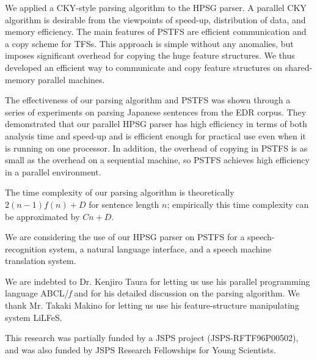   We applied a CKY-style parsing algorithm to the HPSG parser.  A
parallel CKY algorithm is desirable from the viewpoints of speed-up,
distribution of data, and memory efficiency.  The main features of
PSTFS are efficient communication and a copy scheme for TFSs.  This
approach is simple without any anomalies, but imposes significant
overhead for copying the huge feature structures.  We thus developed
an efficient way to communicate and copy feature structures on
shared-memory parallel machines.

  The effectiveness of our parsing algorithm and PSTFS was shown
through a series of experiments on parsing Japanese sentences from the
EDR corpus.  They demonstrated that our parallel HPSG parser has high
efficiency in terms of both analysis time and speed-up and is
efficient enough for practical use even when it is running on one
processor.  In addition, the overhead of copying in PSTFS is as small
as the overhead on a sequential machine, so PSTFS achieves high
efficiency in a parallel environment.

  The time complexity of our parsing algorithm is theoretically
$2(n-1)f(n)+D$ for sentence length $n$; empirically this time
complexity can be approximated by $Cn+D$.

  We are considering the use of our HPSG parser on PSTFS for a
speech-recognition system, a natural language interface, and a speech
machine translation system.

\acknowledgment

We are indebted to Dr. Kenjiro Taura for letting us use his parallel
programming language ABCL/{\it f} and for his detailed discussion on
the parsing algorithm.  We thank Mr. Takaki Makino for letting us use
his feature-structure manipulating system LiLFeS.

This research was partially funded by a JSPS project
(JSPS-RFTF96P00502), and was also funded by JSPS Research Fellowships
for Young Scientists.
  



